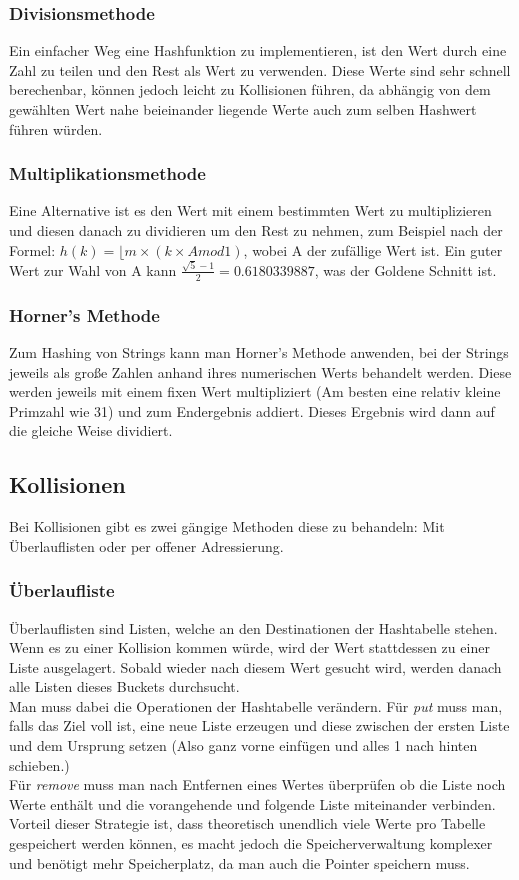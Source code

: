 \documentclass{article}
\begin{document}
	\subsubsection{Divisionsmethode}
	Ein einfacher Weg eine Hashfunktion zu implementieren, ist den Wert durch eine Zahl zu teilen und den Rest als Wert zu verwenden. Diese Werte sind sehr schnell berechenbar, können jedoch leicht zu Kollisionen führen, da abhängig von dem gewählten Wert nahe beieinander liegende Werte auch zum selben Hashwert führen würden.
	\subsubsection{Multiplikationsmethode}
	Eine Alternative ist es den Wert mit einem bestimmten Wert zu multiplizieren und diesen danach zu dividieren um den Rest zu nehmen, zum Beispiel nach der Formel: $h(k)=\lfloor m\times(k\times A mod 1)$, wobei A der zufällige Wert ist. Ein guter Wert zur Wahl von A kann $\frac{\sqrt{5}-1}{2}=0.6180339887$, was der Goldene Schnitt ist.
	\subsubsection{Horner's Methode}
	Zum Hashing von Strings kann man Horner's Methode anwenden, bei der Strings jeweils als große Zahlen anhand ihres numerischen Werts behandelt werden. Diese werden jeweils mit einem fixen Wert multipliziert (Am besten eine relativ kleine Primzahl wie 31) und zum Endergebnis addiert. Dieses Ergebnis wird dann auf die gleiche Weise dividiert.
	\subsection{Kollisionen}
	Bei Kollisionen gibt es zwei gängige Methoden diese zu behandeln: Mit Überlauflisten oder per offener Adressierung.
	\subsubsection{Überlaufliste}
	Überlauflisten sind Listen, welche an den Destinationen der Hashtabelle stehen. Wenn es zu einer Kollision kommen würde, wird der Wert stattdessen zu einer Liste ausgelagert. Sobald wieder nach diesem Wert gesucht wird, werden danach alle Listen dieses Buckets durchsucht. \\
	Man muss dabei die Operationen der Hashtabelle verändern. Für \textit{put} muss man, falls das Ziel voll ist, eine neue Liste erzeugen und diese zwischen der ersten Liste und dem Ursprung setzen (Also ganz vorne einfügen und alles 1 nach hinten schieben.) \\
	Für \textit{remove} muss man nach Entfernen eines Wertes überprüfen ob die Liste noch Werte enthält und die vorangehende und folgende Liste miteinander verbinden. \\
	Vorteil dieser Strategie ist, dass theoretisch unendlich viele Werte pro Tabelle gespeichert werden können, es macht jedoch die Speicherverwaltung komplexer und benötigt mehr Speicherplatz, da man auch die Pointer speichern muss.
\end{document}
